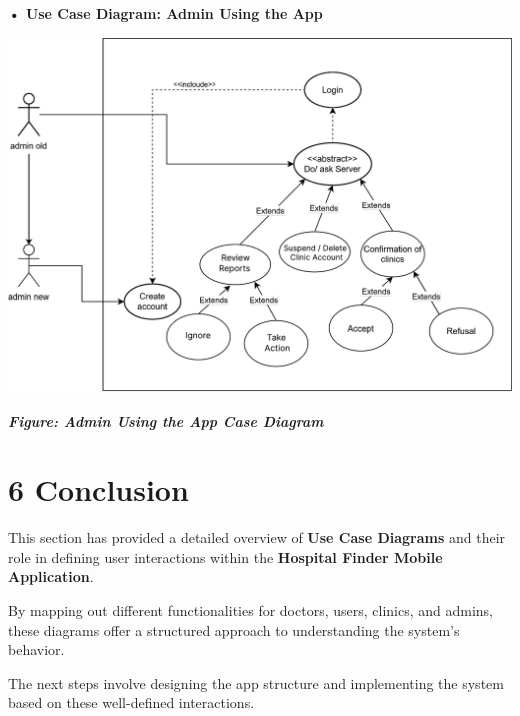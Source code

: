 \documentclass[12pt]{report}
\begin{document}
\vspace{0.5cm}
\noindent \textbf{• Use Case Diagram: Admin Using the App}
\vspace{0.6cm}
\begin{center}
	\includegraphics[width=\textwidth]{images/adminCAs@2x.pdf} %
\end{center}
\vspace{-0.35cm}
\begin{center}
	\textit{\textbf{Figure: Admin Using the App Case Diagram}}
\end{center}

\newpage
\section*{\textbf{6 Conclusion}}

\noindent This section has provided a detailed overview of \textbf{Use Case Diagrams} and their role in defining user interactions within the \textbf{Hospital Finder Mobile Application}.\vspace{0.5cm}

\noindent By mapping out different functionalities for doctors, users, clinics, and admins, these diagrams offer a structured approach to understanding the system's behavior.\vspace{0.5cm}

\noindent The next steps involve designing the app structure and implementing the system based on these well-defined interactions.\vspace{0.5cm}
\end{document}
